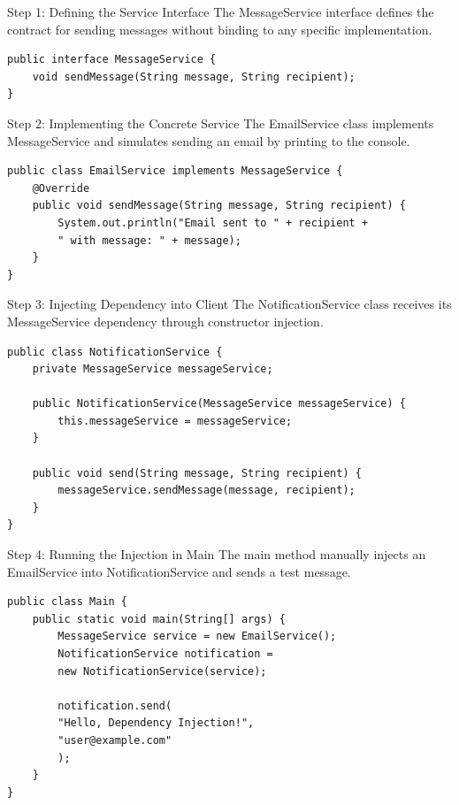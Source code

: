 \documentclass[aspectratio=169, table]{beamer}
\begin{document}
\begin{frame}[fragile]{Step 1: Defining the Service Interface}
\vspace{20pt}
The MessageService interface defines the contract for sending messages without binding to any specific implementation.

\begin{lstlisting}[style=JavaStyle]
public interface MessageService {
	void sendMessage(String message, String recipient);
}
\end{lstlisting}
\end{frame}

\begin{frame}[fragile]{Step 2: Implementing the Concrete Service}
\vspace{20pt}
The EmailService class implements MessageService and simulates sending an email by printing to the console.

\begin{lstlisting}[style=JavaStyle]
public class EmailService implements MessageService {
	@Override
	public void sendMessage(String message, String recipient) {
		System.out.println("Email sent to " + recipient +
		" with message: " + message);
	}
}
\end{lstlisting}
\end{frame}

\begin{frame}[fragile]{Step 3: Injecting Dependency into Client}
\vspace{20pt}
The NotificationService class receives its MessageService dependency through constructor injection.

\begin{lstlisting}[style=JavaStyle]
public class NotificationService {
	private MessageService messageService;
	
	public NotificationService(MessageService messageService) {
		this.messageService = messageService;
	}
	
	public void send(String message, String recipient) {
		messageService.sendMessage(message, recipient);
	}
}
\end{lstlisting}
\end{frame}

\begin{frame}[fragile]{Step 4: Running the Injection in Main}
\vspace{20pt}
The main method manually injects an EmailService into NotificationService and sends a test message.

\begin{lstlisting}[style=JavaStyle]
public class Main {
	public static void main(String[] args) {
		MessageService service = new EmailService();
		NotificationService notification =
		new NotificationService(service);
		
		notification.send(
		"Hello, Dependency Injection!",
		"user@example.com"
		);
	}
}
\end{lstlisting}
\end{frame}
\end{document}
